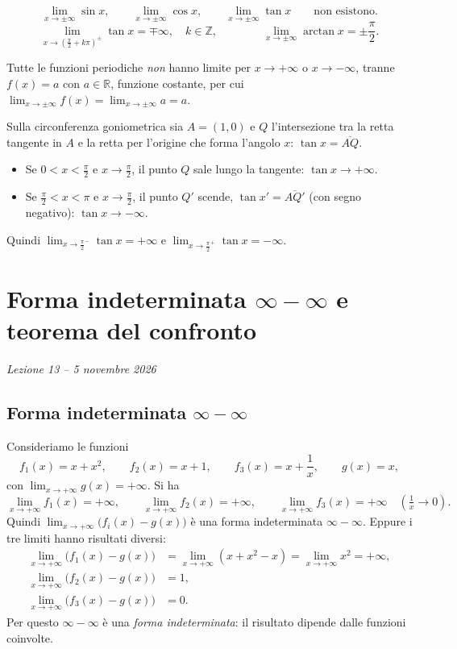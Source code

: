 \documentclass[11pt,a4paper]{article}
\begin{document}
\[
\lim_{x\to\pm\infty}\sin x, \qquad \lim_{x\to\pm\infty}\cos x, \qquad \lim_{x\to\pm\infty}\tan x \qquad\text{non esistono.}
\]
\[
\lim_{x\to\left(\frac{\pi}{2} + k\pi\right)^{\pm}} \tan x = \mp\infty, \quad k \in \mathbb{Z}, \qquad\qquad
\lim_{x\to\pm\infty}\arctan x = \pm\frac{\pi}{2}.
\]

\begin{proposizione}
Tutte le funzioni periodiche \emph{non} hanno limite per $x \to +\infty$ o $x \to -\infty$, tranne $f(x) = a$ con $a \in \mathbb{R}$, funzione costante, per cui $\displaystyle\lim_{x\to\pm\infty} f(x) = \lim_{x\to\pm\infty} a = a$.
\end{proposizione}

\begin{esempio}
Sulla circonferenza goniometrica sia $A = (1, 0)$ e $Q$ l'intersezione tra la retta tangente in $A$ e la retta per l'origine che forma l'angolo $x$: $\tan x = \overline{AQ}$.
\begin{itemize}
  \item Se $0 < x < \frac{\pi}{2}$ e $x \to \frac{\pi}{2}$, il punto $Q$ sale lungo la tangente: $\tan x \to +\infty$.
  \item Se $\frac{\pi}{2} < x < \pi$ e $x \to \frac{\pi}{2}$, il punto $Q'$ scende, $\tan x' = \overline{AQ'}$ (con segno negativo): $\tan x \to -\infty$.
\end{itemize}
Quindi $\displaystyle\lim_{x\to\frac{\pi}{2}^-}\tan x = +\infty$ e $\displaystyle\lim_{x\to\frac{\pi}{2}^+}\tan x = -\infty$.
\end{esempio}

\section[Forma indeterminata $\infty-\infty$ e teorema del confronto (Lezione 13 -- 5 novembre 2026)]{Forma indeterminata $\infty-\infty$ e teorema del confronto}
\noindent\emph{Lezione 13 -- 5 novembre 2026}
\subsection{Forma indeterminata $\infty - \infty$}

Consideriamo le funzioni
\[
f_1(x) = x + x^2, \qquad f_2(x) = x + 1, \qquad f_3(x) = x + \frac{1}{x}, \qquad g(x) = x,
\]
con $\displaystyle\lim_{x\to+\infty} g(x) = +\infty$. Si ha
\[
\lim_{x\to+\infty} f_1(x) = +\infty, \qquad \lim_{x\to+\infty} f_2(x) = +\infty, \qquad \lim_{x\to+\infty} f_3(x) = +\infty \quad\left(\tfrac{1}{x} \to 0\right).
\]
Quindi $\displaystyle\lim_{x\to+\infty}\big(f_i(x) - g(x)\big)$ è una forma indeterminata $\infty - \infty$. Eppure i tre limiti hanno risultati diversi:
\begin{align*}
  \lim_{x\to+\infty}\big(f_1(x) - g(x)\big) &= \lim_{x\to+\infty}(x + x^2 - x) = \lim_{x\to+\infty} x^2 = +\infty,\\
  \lim_{x\to+\infty}\big(f_2(x) - g(x)\big) &= 1,\\
  \lim_{x\to+\infty}\big(f_3(x) - g(x)\big) &= 0 .
\end{align*}
Per questo $\infty - \infty$ è una \emph{forma indeterminata}: il risultato dipende dalle funzioni coinvolte.
\end{document}
